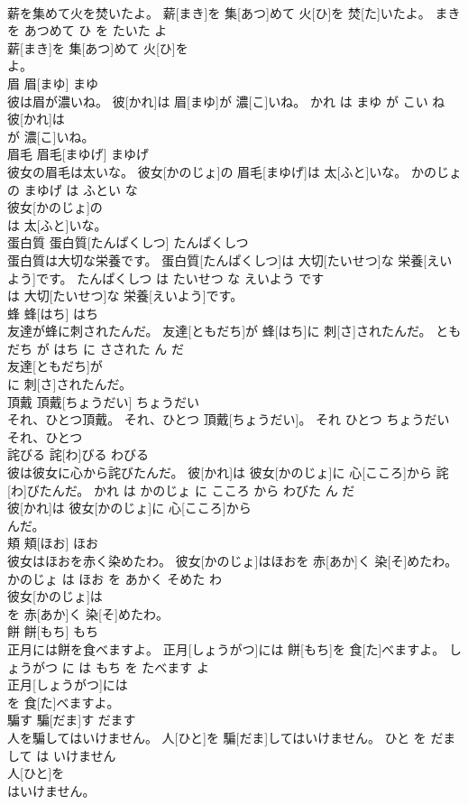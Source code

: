 \documentclass[8pt]{extreport}
\begin{document}
\begin{CJK}{UTF8}{min}
\\	薪を集めて火を焚いたよ。	薪[まき]を 集[あつ]めて 火[ひ]を 焚[た]いたよ。	まき を あつめて ひ を たいた よ	
\\	薪[まき]を 集[あつ]めて 火[ひ]を
\\	よ。			
\\	眉	眉[まゆ]	まゆ	
\\	彼は眉が濃いね。	彼[かれ]は 眉[まゆ]が 濃[こ]いね。	かれ は まゆ が こい ね	
\\	彼[かれ]は
\\	が 濃[こ]いね。			
\\	眉毛	眉毛[まゆげ]	まゆげ	
\\	彼女の眉毛は太いな。	彼女[かのじょ]の 眉毛[まゆげ]は 太[ふと]いな。	かのじょ の まゆげ は ふとい な	
\\	彼女[かのじょ]の
\\	は 太[ふと]いな。			
\\	蛋白質	蛋白質[たんぱくしつ]	たんぱくしつ	
\\	蛋白質は大切な栄養です。	蛋白質[たんぱくしつ]は 大切[たいせつ]な 栄養[えいよう]です。	たんぱくしつ は たいせつ な えいよう です	
\\	は 大切[たいせつ]な 栄養[えいよう]です。			
\\	蜂	蜂[はち]	はち	
\\	友達が蜂に刺されたんだ。	友達[ともだち]が 蜂[はち]に 刺[さ]されたんだ。	ともだち が はち に さされた ん だ	
\\	友達[ともだち]が
\\	に 刺[さ]されたんだ。			
\\	頂戴	頂戴[ちょうだい]	ちょうだい	
\\	それ、ひとつ頂戴。	それ、ひとつ 頂戴[ちょうだい]。	それ ひとつ ちょうだい	
\\	それ、ひとつ
\\	詫びる	詫[わ]びる	わびる	
\\	彼は彼女に心から詫びたんだ。	彼[かれ]は 彼女[かのじょ]に 心[こころ]から 詫[わ]びたんだ。	かれ は かのじょ に こころ から わびた ん だ	
\\	彼[かれ]は 彼女[かのじょ]に 心[こころ]から
\\	んだ。			
\\	頬	頬[ほお]	ほお	
\\	彼女はほおを赤く染めたわ。	彼女[かのじょ]はほおを 赤[あか]く 染[そ]めたわ。	かのじょ は ほお を あかく そめた わ	
\\	彼女[かのじょ]は
\\	を 赤[あか]く 染[そ]めたわ。			
\\	餅	餅[もち]	もち	
\\	正月には餅を食べますよ。	正月[しょうがつ]には 餅[もち]を 食[た]べますよ。	しょうがつ に は もち を たべます よ	
\\	正月[しょうがつ]には
\\	を 食[た]べますよ。			
\\	騙す	騙[だま]す	だます	
\\	人を騙してはいけません。	人[ひと]を 騙[だま]してはいけません。	ひと を だまして は いけません	
\\	人[ひと]を
\\	はいけません。			
\end{CJK}
\end{document}
